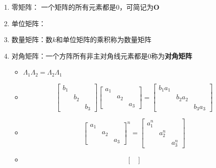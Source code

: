 \documentclass[./linear_algebra.tex]{subfiles}
\begin{document}
    \begin{enumerate}
        \item 零矩阵： 一个矩阵的所有元素都是$0$，可简记为$\mathbf{O}$
        \item 单位矩阵：
        \item 数量矩阵：数$k$和单位矩阵的乘积称为数量矩阵
        \item 对角矩阵：一个方阵所有非主对角线元素都是0称为\textbf{对角矩阵}
        \begin{itemize}
            \item $\Lambda_1\Lambda_2 = \Lambda_2\Lambda_1$
            \item
            \[
                \begin{bmatrix}
                    b_1 &     &     \\
                    & b_2 &     \\
                    &     & b_3
                \end{bmatrix}
                \begin{bmatrix}
                    a_1 &     &     \\
                    & a_2 &     \\
                    &     & a_3
                \end{bmatrix}
                =
                \begin{bmatrix}
                    b_1 a_1 &         &         \\
                    & b_2 a_2 &         \\
                    &         & b_3 a_3
                \end{bmatrix}
            \]
            \item
            \[
                \begin{bmatrix}
                    a_1 &     &     \\
                    & a_2 &     \\
                    &     & a_3
                \end{bmatrix}^n
                = \begin{bmatrix}
                      a_{1}^n &         &         \\
                      & a_{2}^n &         \\
                      &         & a_{3}^n
                \end{bmatrix}
            \]
            \item
            \[
                \begin{bmatrix}

\end{bmatrix}\]
\end{itemize}
\end{enumerate}
\end{document}

